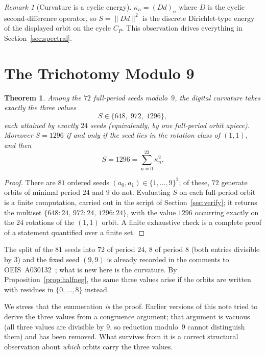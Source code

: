 \documentclass[12pt]{article}
\newtheorem{thm}{Theorem}
\theoremstyle{remark}
\newtheorem{rem}{Remark}
\begin{document}
\begin{rem}[Curvature is a cyclic energy]
$\kappa_n=(D d)_n$ where $D$ is the cyclic second-difference operator, so
$S=\lVert Dd\rVert^2$ is the discrete Dirichlet-type energy of the displayed orbit on the
cycle $C_P$. This observation drives everything in Section~\ref{sec:spectral}.
\end{rem}

\section{The Trichotomy Modulo 9}\label{sec:trichotomy}

\begin{thm}\label{thm:trichotomy}
Among the $72$ full-period seeds modulo~$9$, the digital curvature takes exactly the three
values
\[
S\in\{648,\;972,\;1296\},
\]
each attained by exactly $24$ seeds (equivalently, by one full-period orbit apiece).
Moreover $S=1296$ if and only if the seed lies in the rotation class of $(1,1)$, and then
\[
S=1296=\sum_{n=0}^{23}\kappa_n^2 .
\]
\end{thm}

\begin{proof}
There are $81$ ordered seeds $(a_0,a_1)\in\{1,\dots,9\}^2$; of these, $72$ generate orbits
of minimal period $24$ and $9$ do not. Evaluating $S$ on each full-period orbit is a
finite computation, carried out in the script of Section~\ref{sec:verify}; it returns the
multiset $\{648{:}24,\,972{:}24,\,1296{:}24\}$, with the value $1296$ occurring exactly on
the $24$ rotations of the $(1,1)$ orbit. A finite exhaustive check is a complete proof of a
statement quantified over a finite set.
\end{proof}

The split of the $81$ seeds into $72$ of period $24$, $8$ of period $8$ (both entries
divisible by $3$) and the fixed seed $(9,9)$ is already recorded in the comments to
OEIS~A030132~\cite{OEIS}; what is new here is the curvature. By
Proposition~\ref{prop:halfneg}, the same three values arise if the orbits are written with
residues in $\{0,\dots,8\}$ instead.

We stress that the enumeration \emph{is} the proof. Earlier versions of this note tried to
derive the three values from a congruence argument; that argument is vacuous (all three
values are divisible by $9$, so reduction modulo~$9$ cannot distinguish them) and has been
removed. What survives from it is a correct structural observation about \emph{which}
orbits carry the three values.
\end{document}
